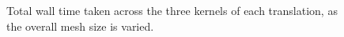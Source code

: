 \begin{figure}[H]
    \centering
    \fbox{}
    \captionsetup{skip=0pt}
    \caption{Total wall time taken across the three kernels of each translation, as the overall mesh size is varied.}
    \label{fig:translations_total_line}
\end{figure}

%     





